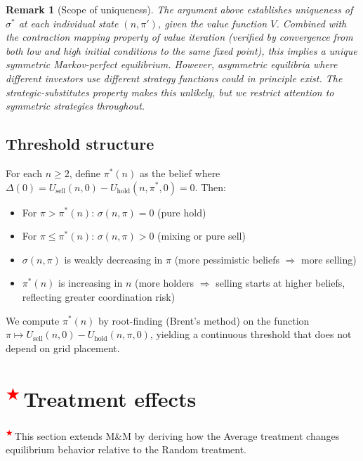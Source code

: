 \documentclass[11pt]{article}
\newtheorem{remark}{Remark}
\newcommand{\extension}{\textsuperscript{\textcolor{red}{$\bigstar$}}\,}
\begin{document}
\begin{remark}[Scope of uniqueness]
The argument above establishes uniqueness of $\sigma^*$ at each individual
state $(n, \pi')$, \textit{given} the value function $V$. Combined with the
contraction mapping property of value iteration (verified by convergence from
both low and high initial conditions to the same fixed point), this implies
a unique symmetric Markov-perfect equilibrium. However, asymmetric equilibria
where different investors use different strategy functions could in principle
exist. The strategic-substitutes property makes this unlikely, but we restrict
attention to symmetric strategies throughout.
\end{remark}

\subsection{Threshold structure}

For each $n \geq 2$, define $\pi^*(n)$ as the belief where
$\Delta(0) = U_{\text{sell}}(n, 0) - U_{\text{hold}}(n, \pi^*, 0) = 0$. Then:
\begin{itemize}
    \item For $\pi > \pi^*(n)$: $\sigma(n, \pi) = 0$ (pure hold)
    \item For $\pi \leq \pi^*(n)$: $\sigma(n, \pi) > 0$ (mixing or pure sell)
    \item $\sigma(n, \pi)$ is weakly decreasing in $\pi$ (more pessimistic
          beliefs $\Rightarrow$ more selling)
    \item $\pi^*(n)$ is increasing in $n$ (more holders $\Rightarrow$ selling
          starts at higher beliefs, reflecting greater coordination risk)
\end{itemize}
We compute $\pi^*(n)$ by root-finding (Brent's method) on the function
$\pi \mapsto U_{\text{sell}}(n, 0) - U_{\text{hold}}(n, \pi, 0)$, yielding
a continuous threshold that does not depend on grid placement.

\section{\extension Treatment effects}\label{sec:treatment_effects}

\extension This section extends M\&M by deriving how the Average treatment
changes equilibrium behavior relative to the Random treatment.
\end{document}
